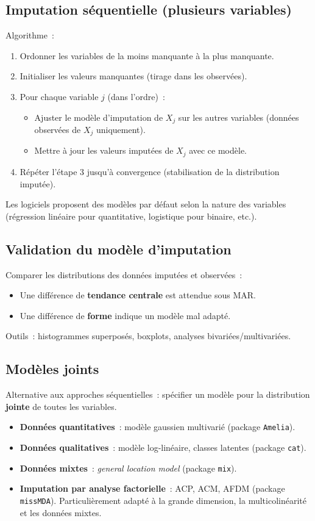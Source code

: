 \documentclass[a4paper,11pt]{article}
\theoremstyle{definition}
\theoremstyle{remark}
\begin{document}
\subsection{Imputation séquentielle (plusieurs variables)}

Algorithme~:
\begin{enumerate}
  \item Ordonner les variables de la moins manquante à la plus manquante.
  \item Initialiser les valeurs manquantes (tirage dans les observées).
  \item Pour chaque variable $j$ (dans l'ordre)~:
    \begin{itemize}
      \item Ajuster le modèle d'imputation de $X_j$ sur les autres
        variables (données observées de $X_j$ uniquement).
      \item Mettre à jour les valeurs imputées de $X_j$ avec ce modèle.
    \end{itemize}
  \item Répéter l'étape 3 jusqu'à convergence (stabilisation de la
    distribution imputée).
\end{enumerate}
Les logiciels proposent des modèles par défaut selon la nature des
variables (régression linéaire pour quantitative, logistique pour
binaire, etc.).

\subsection{Validation du modèle d'imputation}

Comparer les distributions des données imputées et observées~:
\begin{itemize}
  \item Une différence de \textbf{tendance centrale} est attendue sous MAR.
  \item Une différence de \textbf{forme} indique un modèle mal adapté.
\end{itemize}
Outils~: histogrammes superposés, boxplots, analyses bivariées/multivariées.

\subsection{Modèles joints}

Alternative aux approches séquentielles~: spécifier un modèle pour la
distribution \textbf{jointe} de toutes les variables.

\begin{itemize}
  \item \textbf{Données quantitatives}~: modèle gaussien multivarié
    (package \texttt{Amelia}).
  \item \textbf{Données qualitatives}~: modèle log-linéaire, classes
    latentes (package \texttt{cat}).
  \item \textbf{Données mixtes}~: \textit{general location model}
    (package \texttt{mix}).
  \item \textbf{Imputation par analyse factorielle}~: ACP, ACM, AFDM
    (package \texttt{missMDA}). Particulièrement adapté à la grande
    dimension, la multicolinéarité et les données mixtes.
\end{itemize}
\end{document}
